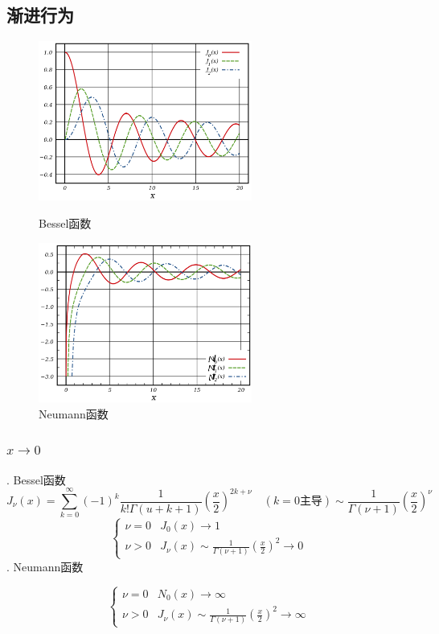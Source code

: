 \subsection{渐进行为}
\begin{figure}[htbp]
    \centering
    \begin{minipage}[t]{0.48\textwidth}
    \centering
    \includegraphics[width=7cm]{figures/BesselFunction.png}
    \caption{Bessel函数}
    \end{minipage}
    \begin{minipage}[t]{0.48\textwidth}
    \centering
    \includegraphics[width=7cm]{figures/NeumannFunction.png}
    \caption{Neumann函数}
    \end{minipage}
\end{figure}
\subsubsection{$x\rightarrow0$}
. Bessel函数
$$J_{\nu}(x)=
\sum_{k=0}^{\infty}(-1)^{k}\frac{1}{k!\Gamma(u+k+1)}\left(\frac{x}{2}\right)^{2k+\nu}
\quad (k=0\mbox{主导})\sim\frac{1}{\Gamma(\nu+1)}\left(\frac{x}{2}\right)^{\nu}
$$
$$
\begin{cases}\nu=0&J_{0}(x)\rightarrow1\\\nu>0&J_{\nu}(x)\sim\frac{1}{\Gamma(\nu+1)}(\frac{x}{2})^{2}\rightarrow0\end{cases}
$$
. Neumann函数

$$
\begin{cases}
    \nu=0&N_{0}(x)\rightarrow\infty\\
    \nu>0&J_{\nu}(x)\sim\frac{1}{\Gamma(\nu+1)}(\frac{x}{2})^{2}\rightarrow\infty
\end{cases}$$

